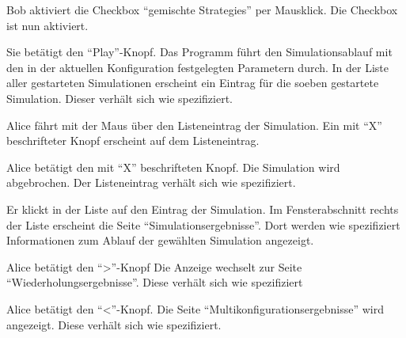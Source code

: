 \documentclass[parskip=full,11pt]{scrartcl}
\begin{document}
{Bob aktiviert die Checkbox \enquote{\glspl{gemischte Strategie}} per Mausklick.}
{Die Checkbox ist nun aktiviert.}


{Sie betätigt den \enquote{Play}-Knopf.}
{Das Programm führt den Simulationsablauf mit den in der aktuellen \Gls{Konfiguration} festgelegten Parametern durch. In der Liste aller gestarteten Simulationen erscheint ein Eintrag für die soeben gestartete Simulation. Dieser verhält sich wie spezifiziert.}

{Alice fährt mit der Maus über den Listeneintrag der Simulation.}
{Ein mit \enquote{X} beschrifteter Knopf erscheint auf dem Listeneintrag.}

{Alice betätigt den mit \enquote{X} beschrifteten Knopf.}
{Die Simulation wird abgebrochen. Der Listeneintrag verhält sich wie spezifiziert.}

{Er klickt in der Liste auf den Eintrag der Simulation.}
{Im Fensterabschnitt rechts der Liste erscheint die Seite \enquote{Simulationsergebnisse}. Dort werden wie spezifiziert Informationen zum Ablauf der gewählten Simulation angezeigt.}

{Alice betätigt den \enquote{>}-Knopf}
{Die Anzeige wechselt zur Seite \enquote{Wiederholungsergebnisse}. Diese verhält sich wie spezifiziert}

{Alice betätigt den \enquote{<}-Knopf.}
{Die Seite \enquote{Multikonfigurationsergebnisse} wird angezeigt. Diese verhält sich wie spezifiziert.}

\end{document}
